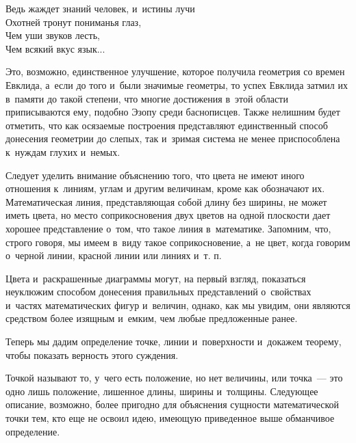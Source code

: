 \documentclass[letters,booklanguage=russian]{byrnebook}
\begin{document}
\begin{center} %
Ведь жаждет знаний человек, и~истины лучи\\
Охотней тронут пониманья глаз,\\
Чем уши звуков лесть,\\
Чем всякий вкус язык...
\end{center}

\baselineskip

Это, возможно, единственное улучшение, которое получила геометрия со времен Евклида, а~если до того и~были значимые геометры, то успех Евклида затмил их в~памяти до такой степени, что многие достижения в~этой области приписываются ему, подобно Эзопу среди баснописцев. Также нелишним будет отметить, что как осязаемые построения представляют единственный способ донесения геометрии до слепых, так и~зримая система не менее приспособлена к~нуждам глухих и~немых.

Следует уделить внимание объяснению того, что цвета не имеют иного отношения к~линиям, углам и другим величинам, кроме как обозначают их. Математическая линия, представляющая собой длину без ширины, не может иметь цвета, но место соприкосновения двух цветов на одной плоскости дает хорошее представление о~том, что такое линия в~математике. Запомним, что, строго говоря, мы имеем в~виду такое соприкосновение, а~не цвет, когда говорим о~черной линии, красной линии или линиях и~т. п.

Цвета и~раскрашенные диаграммы могут, на первый взгляд, показаться неуклюжим способом донесения правильных представлений о~свойствах и~частях математических фигур и~величин, однако, как мы увидим, они являются средством более изящным и~емким, чем любые предложенные ранее.

Теперь мы дадим определение точке, линии и~поверхности и~докажем теорему, чтобы показать верность этого суждения.

Точкой называют то, у~чего есть положение, но нет величины, или точка~— это одно лишь положение, лишенное длины, ширины и~толщины. Следующее описание, возможно, более пригодно для объяснения сущности математической точки тем, кто еще не освоил идею, имеющую приведенное выше обманчивое определение.
\end{document}
